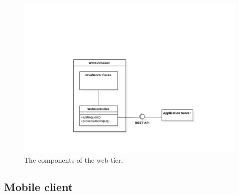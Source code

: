 \begin{figure}
    \centering
    \includegraphics[width=\textwidth]{diagrams/class_webcomponents}
    \caption{The components of the web tier.}
    \label{fig:web-components}
\end{figure}

\subsection{Mobile client}

\FloatBarrier
